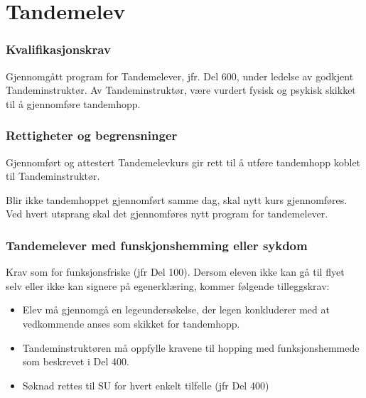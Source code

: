 \section{Tandemelev}
\subsubsection{Kvalifikasjonskrav}
Gjennomgått program for Tandemelever, jfr. Del 600, under ledelse av godkjent Tandeminstruktør. Av Tandeminstruktør, være vurdert fysisk og psykisk skikket til å gjennomføre tandemhopp.

\subsubsection{Rettigheter og begrensninger}
Gjennomført og attestert Tandemelevkurs gir rett til å utføre tandemhopp koblet til Tandeminstruktør.

Blir ikke tandemhoppet gjennomført samme dag, skal nytt kurs gjennomføres. Ved hvert utsprang skal det gjennomføres nytt program for tandemelever.

\subsubsection{Tandemelever med funskjonshemming eller sykdom}
Krav som for funksjonsfriske (jfr Del 100). Dersom eleven ikke kan gå til flyet selv eller ikke kan signere på egenerklæring, kommer følgende tilleggskrav:
\begin{itemize}
	\item Elev må gjennomgå en legeundersøkelse, der legen konkluderer med at vedkommende anses som skikket for tandemhopp.
	\item Tandeminstruktøren må oppfylle kravene til hopping med funksjonshemmede som beskrevet i Del 400.
	\item Søknad rettes til SU for hvert enkelt tilfelle (jfr Del 400)
\end{itemize}
